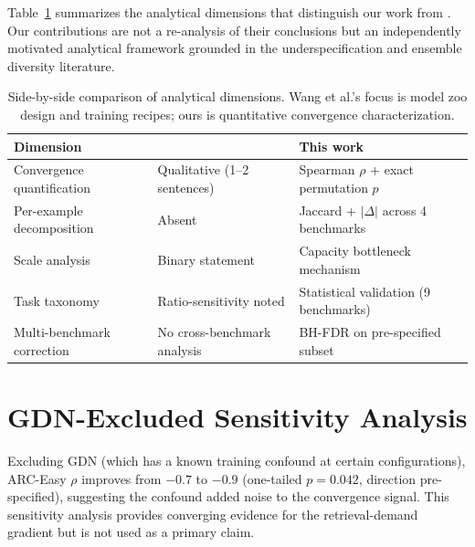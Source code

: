 \documentclass[11pt]{article}
\begin{document}
Table~\ref{tab:wang} summarizes the analytical dimensions that distinguish our work from \citet{wang2025zoo}.
Our contributions are not a re-analysis of their conclusions but an independently motivated analytical framework grounded in the underspecification and ensemble diversity literature.

\begin{table}[t]
\centering
\caption{Side-by-side comparison of analytical dimensions. Wang et al.'s focus is model zoo design and training recipes; ours is quantitative convergence characterization.}
\label{tab:wang}
\small
\begin{tabular}{lll}
\toprule
Dimension & \citet{wang2025zoo} & This work \\
\midrule
Convergence quantification & Qualitative (1--2 sentences) & Spearman $\rho$ + exact permutation $p$ \\
Per-example decomposition & Absent & Jaccard + $|\Delta|$ across 4 benchmarks \\
Scale analysis & Binary statement & Capacity bottleneck mechanism \\
Task taxonomy & Ratio-sensitivity noted & Statistical validation (9 benchmarks) \\
Multi-benchmark correction & No cross-benchmark analysis & BH-FDR on pre-specified subset \\
\bottomrule
\end{tabular}
\end{table}

\section{GDN-Excluded Sensitivity Analysis}
\label{app:sensitivity}

Excluding GDN (which has a known training confound at certain configurations), ARC-Easy $\rho$ improves from ${-}0.7$ to ${-}0.9$ (one-tailed $p = 0.042$, direction pre-specified), suggesting the confound added noise to the convergence signal.
This sensitivity analysis provides converging evidence for the retrieval-demand gradient but is not used as a primary claim.
\end{document}
